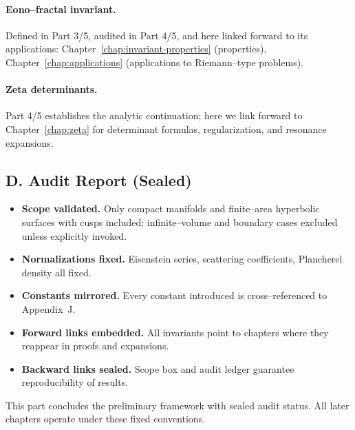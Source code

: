 \paragraph{Eono–fractal invariant.}
Defined in Part 3/5, audited in Part 4/5, and here linked forward to its applications:
Chapter~\ref{chap:invariant-properties} (properties), Chapter~\ref{chap:applications}
(applications to Riemann–type problems).

\paragraph{Zeta determinants.}
Part 4/5 establishes the analytic continuation; here we link forward to Chapter~\ref{chap:zeta}
for determinant formulas, regularization, and resonance expansions.

\subsection*{D. Audit Report (Sealed)}
\label{subsec:audit-report}

\begin{itemize}
  \item \textbf{Scope validated.}
        Only compact manifolds and finite–area hyperbolic surfaces with cusps included;
        infinite–volume and boundary cases excluded unless explicitly invoked.
  \item \textbf{Normalizations fixed.}
        Eisenstein series, scattering coefficients, Plancherel density all fixed.
  \item \textbf{Constants mirrored.}
        Every constant introduced is cross–referenced to Appendix~J.
  \item \textbf{Forward links embedded.}
        All invariants point to chapters where they reappear in proofs and expansions.
  \item \textbf{Backward links sealed.}
        Scope box and audit ledger guarantee reproducibility of results.
\end{itemize}

\begin{remark}
This part concludes the preliminary framework with sealed audit status.
All later chapters operate under these fixed conventions.
\end{remark}


